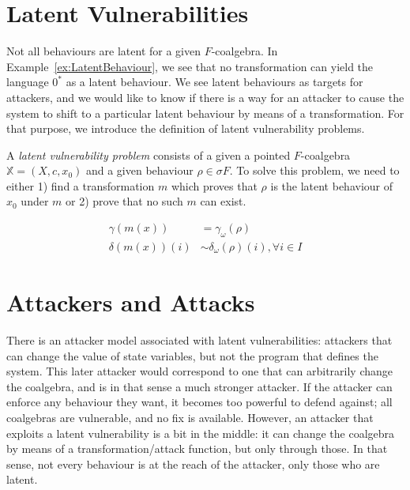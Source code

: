 
\section{Latent Vulnerabilities}
Not all behaviours are latent for a given $F$-coalgebra. In Example~\ref{ex:LatentBehaviour}, we see that no transformation can yield the language $0^*$ as a latent behaviour. We see latent behaviours as targets for attackers, and we would like to know if there is a way for an attacker to cause the system to shift to a particular latent behaviour by means of a transformation. For that purpose, we introduce the definition of {latent vulnerability problems}.

\begin{definition}
A \emph{latent vulnerability problem} consists of a given a pointed $F$-coalgebra $\mathbb{X}=(X,c,x_0)$ and a given behaviour $\rho\in \sigma F$. To solve this problem, we need to either 1) find a transformation $m$ which proves that $\rho$ is the latent behaviour of $x_0$ under $m$ or 2) prove that no such $m$ can exist.
\end{definition}


\begin{align}
\gamma(m(x))&=\gamma_\omega(\rho)\\
\delta(m(x))(i)&\sim \delta_\omega(\rho)(i), \forall i\in I
\end{align}


 
\section{Attackers and Attacks}
There is an attacker model associated with latent vulnerabilities: attackers that can change the value of state variables, but not the program that defines the system. This later attacker would correspond to one that can arbitrarily change the coalgebra, and is in that sense a much stronger attacker. If the attacker can enforce any behaviour they want, it becomes too powerful to defend against; all coalgebras are vulnerable, and no fix is available. However, an attacker that exploits a latent vulnerability is a bit in the middle: it can change the coalgebra by means of a transformation/attack function, but only through those. In that sense, not every behaviour is at the reach of the attacker, only those who are latent.

